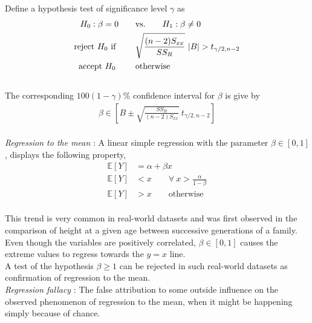 Define a hypothesis test of significance level $ \gamma $ as \\

\begin{align}
	H_0 : \beta = 0 \qquad &\text{vs.} \qquad H_1 : \beta \neq 0 \nonumber \\
	\text{reject $ H_0 $ if } \qquad & \sqrt{\frac{(n-2) S_{xx}}{SS_R}}\ |B| > t_{\gamma/2, n-2} \nonumber \\
	\text{accept $ H_0 $  } \qquad & \text{otherwise}
\end{align} \\

The corresponding $ 100(1-\gamma)\% $ confidence interval for $ \beta $ is give by \\

\begin{align}
	\beta \in \left[B \pm \sqrt{{\frac{SS_R}{(n-2) S_{xx}}}}\ t_{\gamma/2, n-2}  \right]
\end{align}\\

\textit{Regression to the mean} : A linear simple regression with the parameter $ \beta \in [0, 1] $, displays the following property,\\

\begin{align}
	\mathbb{E}[Y] &= \alpha + \beta x \qquad \nonumber \\
	\mathbb{E}[Y] &< x \qquad \forall\ x > \frac{\alpha}{1 - \beta} \nonumber \\
	\mathbb{E}[Y] &> x \qquad \text{otherwise}
\end{align} \\

This trend is very common in real-world datasets and was first observed in the comparison of height at a given age between successive generations of a family. Even though the variables are positively correlated, $ \beta \in [0, 1] $ causes the extreme values to regress towards the $ y = x $ line.\\

A test of the hypothesis $ \beta \geq 1 $ can be rejected in such real-world datasets as confirmation of regression to the mean.\\

\textit{Regression fallacy} : The false attribution to some outside influence on the observed phenomenon of regression to the mean, when it might be happening simply because of chance.\\

